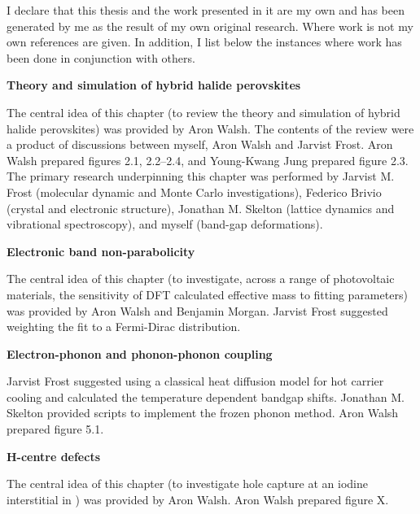 I declare that this thesis and the work presented in it are my own and has been generated by me as the result of my own original research. Where work is not my own references are given. In addition, I list below the instances where work has been done in conjunction with others.
\vspace{\frontmatterbaselineskip}

\textbf{Theory and simulation of hybrid halide perovskites } 

The central idea of this chapter (to review the theory and simulation of hybrid halide perovskites) was provided by Aron Walsh. The contents of the review were a product of discussions between myself, Aron Walsh and Jarvist Frost. Aron Walsh prepared figures 2.1, 2.2--2.4, and Young-Kwang Jung prepared figure 2.3. The primary research underpinning this chapter was performed by Jarvist M. Frost (molecular dynamic and Monte Carlo investigations), Federico Brivio (crystal and electronic structure), Jonathan M. Skelton (lattice dynamics and vibrational spectroscopy), and myself (band-gap deformations).

\vspace{\frontmatterbaselineskip}

\textbf{Electronic band non-parabolicity}

The central idea of this chapter (to investigate, across a range of photovoltaic materials, the sensitivity of DFT calculated effective mass to fitting parameters) was provided by Aron Walsh and Benjamin Morgan. Jarvist Frost suggested weighting the fit to a Fermi-Dirac distribution. 

\vspace{\frontmatterbaselineskip}

\textbf{Electron-phonon and phonon-phonon coupling}

Jarvist Frost suggested using a classical heat diffusion model for hot carrier cooling and calculated the temperature dependent bandgap shifts. Jonathan M. Skelton provided scripts to implement the frozen phonon method. Aron Walsh prepared figure 5.1.

\vspace{\frontmatterbaselineskip}

\textbf{H-centre defects}

The central idea of this chapter (to investigate hole capture at an iodine interstitial in ) was provided by Aron Walsh. Aron Walsh prepared figure X.